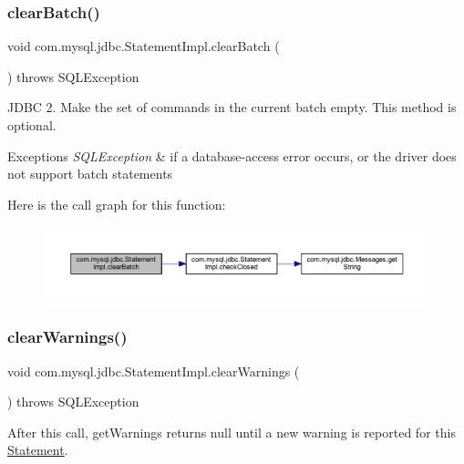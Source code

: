 \subsubsection{\texorpdfstring{clear\+Batch()}{clearBatch()}}
{\footnotesize\ttfamily void com.\+mysql.\+jdbc.\+Statement\+Impl.\+clear\+Batch (\begin{DoxyParamCaption}{ }\end{DoxyParamCaption}) throws S\+Q\+L\+Exception}

J\+D\+BC 2. Make the set of commands in the current batch empty. This method is optional.


\begin{DoxyExceptions}{Exceptions}
{\em S\+Q\+L\+Exception} & if a database-\/access error occurs, or the driver does not support batch statements \\
\hline
\end{DoxyExceptions}
Here is the call graph for this function\+:
\nopagebreak
\begin{figure}[H]
\begin{center}
\leavevmode
\includegraphics[width=350pt]{classcom_1_1mysql_1_1jdbc_1_1_statement_impl_adfc1b8c91ff6752b061d02293fc4dd78_cgraph}
\end{center}
\end{figure}
\mbox{\label{classcom_1_1mysql_1_1jdbc_1_1_statement_impl_a3c483be7df71683de12dd730bd90059e}} 
\subsubsection{\texorpdfstring{clear\+Warnings()}{clearWarnings()}}
{\footnotesize\ttfamily void com.\+mysql.\+jdbc.\+Statement\+Impl.\+clear\+Warnings (\begin{DoxyParamCaption}{ }\end{DoxyParamCaption}) throws S\+Q\+L\+Exception}

After this call, get\+Warnings returns null until a new warning is reported for this \mbox{\hyperlink{interfacecom_1_1mysql_1_1jdbc_1_1_statement}{Statement}}.


